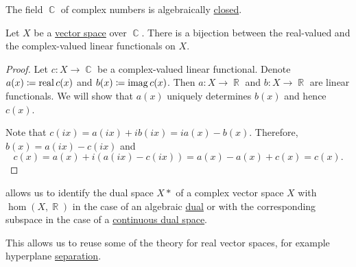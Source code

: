 \begin{theorem}\label{thm:fundamental_theorem_of_algebra}
  The field \( \BbbC \) of complex numbers is algebraically \hyperref[def:algebraically_closed_field]{closed}.
\end{theorem}

\begin{theorem}\label{thm:linear_functionals_over_c}
  Let \( X \) be a \hyperref[def:vector_space]{vector space} over \( \BbbC \). There is a bijection between the real-valued and the complex-valued linear functionals on \( X \).
\end{theorem}
\begin{proof}
  Let \( c: X \to \BbbC \) be a complex-valued linear functional. Denote \( a(x) \coloneqq \operatorname{real} c(x) \) and \( b(x) \coloneqq \operatorname{imag} c(x) \). Then \( a: X \to \BbbR \) and \( b: X \to \BbbR \) are linear functionals. We will show that \( a(x) \) uniquely determines \( b(x) \) and hence \( c(x) \).

  Note that \( c(ix) = a(ix) + i b(ix) = i a(x) - b(x) \). Therefore, \( b(x) = a(ix) - c(ix) \) and
  \begin{equation*}
    c(x) = a(x) + i (a(ix) - c(ix)) = a(x) - a(x) + c(x) = c(x).
  \end{equation*}
\end{proof}

\begin{remark}\label{rem:linear_functionals_over_c}
   allows us to identify the dual space \( X* \) of a complex vector space \( X \) with \( \hom(X, \BbbR) \) in the case of an algebraic \hyperref[def:dual_vector_space]{dual} or with the corresponding subspace in the case of a \hyperref[def:continuous_dual_space]{continuous dual space}.

  This allows us to reuse some of the theory for real vector spaces, for example hyperplane \hyperref[def:hyperplane_separation]{separation}.
\end{remark}

